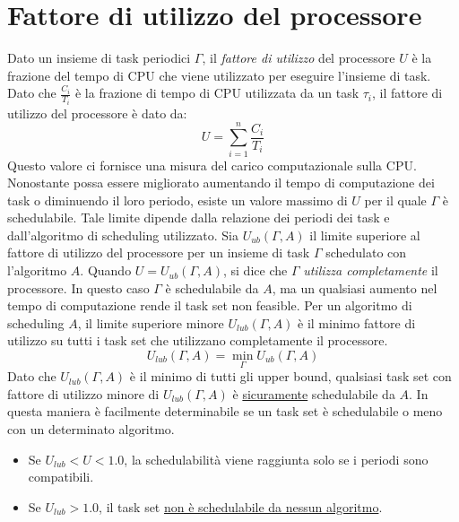 \documentclass[12pt,openany,onesided]{book}
\begin{document}
\section{Fattore di utilizzo del processore}
Dato un insieme di task periodici $\Gamma$, il \textit{fattore di utilizzo} del processore $U$ è la frazione del tempo di CPU che viene utilizzato per eseguire l'insieme di task.
Dato che $\frac{C_i}{T_i}$ è la frazione di tempo di CPU utilizzata da un task $\tau_i$, il fattore di utilizzo del processore è dato da:
\begin{equation}
    U = \sum_{i=1}^{n} \frac{C_i}{T_i}
\end{equation}
Questo valore ci fornisce una misura del carico computazionale sulla CPU. Nonostante possa essere migliorato aumentando il tempo di computazione dei task o diminuendo il loro periodo, esiste un valore massimo 
di $U$ per il quale $\Gamma$ è schedulabile. Tale limite dipende dalla relazione dei periodi dei task e dall'algoritmo di scheduling utilizzato.
Sia $U_{ub}(\Gamma,A)$ il limite superiore al fattore di utilizzo del processore per un insieme di task $\Gamma$ schedulato con l'algoritmo $A$.
Quando $U = U_{ub}(\Gamma,A)$, si dice che $\Gamma$ \textit{utilizza completamente} il processore. In questo caso $\Gamma$ è schedulabile da $A$, ma un qualsiasi aumento nel tempo di computazione rende il task set non feasible.
Per un algoritmo di scheduling $A$, il limite superiore minore $U_{lub}(\Gamma,A)$ è il minimo fattore di utilizzo su tutti i task set che utilizzano completamente il processore.
\begin{equation}
    U_{lub}(\Gamma,A) = \min_{\Gamma } U_{ub}(\Gamma,A)
\end{equation}
Dato che $U_{lub}(\Gamma,A)$ è il minimo di tutti gli upper bound, qualsiasi task set con fattore di utilizzo minore di $U_{lub}(\Gamma,A)$ è \underline{sicuramente} schedulabile da $A$. In questa maniera 
è facilmente determinabile se un task set è schedulabile o meno con un determinato algoritmo. 
\begin{itemize}
    \item Se $ U_{lub}< U < 1.0$, la schedulabilità viene raggiunta solo se i periodi sono compatibili.
    \item Se $U_{lub} > 1.0 $, il task set \underline{non è schedulabile da nessun algoritmo}.
\end{itemize}
\end{document}
